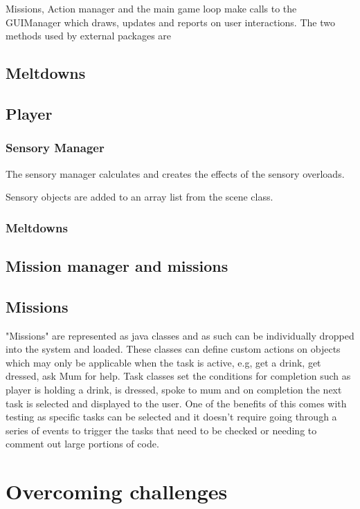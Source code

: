 \documentclass[11pt]{report}
\begin{document}
Missions, Action manager and the main game loop make calls to the GUIManager which draws, updates and reports on user interactions. The two methods used by external packages are 

\subsection{Meltdowns}

\subsection{Player}

\subsubsection{Sensory Manager}
The sensory manager calculates and creates the effects of the sensory overloads.

Sensory objects are added to an array list from the scene class.

\subsubsection{Meltdowns}


\subsection{Mission manager and missions}


\subsection{Missions}
"Missions" are represented as java classes and as such can be individually dropped into the system and loaded. These classes can define custom actions on objects which may only be applicable when the task is active, e.g, get a drink, get dressed, ask Mum for help. Task classes set the conditions for completion such as player is holding a drink, is dressed, spoke to mum and on completion the next task is selected and displayed to the user. One of the benefits of this comes with testing as specific tasks can be selected and it doesn't require going through a series of events to trigger the tasks that need to be checked or needing to comment out large portions of code.

\section{Overcoming challenges}
\end{document}
